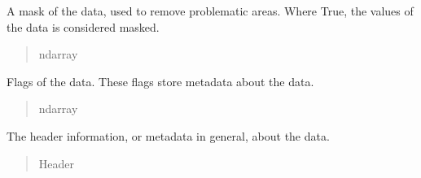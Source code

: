\documentclass[letterpaper,11pt,english]{sphinxmanual}
\begin{document}
\begin{savenotes}
\begin{fulllineitems}

\begin{savenotes}\begin{fulllineitems}
\label{\detokenize{code/lezargus.container.parent:lezargus.container.parent.LezargusContainerArithmetic.mask}}
\pysigstartsignatures
{}
\pysigstopsignatures
\sphinxAtStartPar
A mask of the data, used to remove problematic areas. Where True,
the values of the data is considered masked.
\begin{quote}\begin{description}
\sphinxAtStartPar
ndarray

\end{description}\end{quote}

\end{fulllineitems}\end{savenotes}


\begin{savenotes}\begin{fulllineitems}
\label{\detokenize{code/lezargus.container.parent:lezargus.container.parent.LezargusContainerArithmetic.flags}}
\pysigstartsignatures
{}
\pysigstopsignatures
\sphinxAtStartPar
Flags of the data. These flags store metadata about the data.
\begin{quote}\begin{description}
\sphinxAtStartPar
ndarray

\end{description}\end{quote}

\end{fulllineitems}\end{savenotes}


\begin{savenotes}\begin{fulllineitems}
\label{\detokenize{code/lezargus.container.parent:lezargus.container.parent.LezargusContainerArithmetic.header}}
\pysigstartsignatures
{}
\pysigstopsignatures
\sphinxAtStartPar
The header information, or metadata in general, about the data.
\begin{quote}\begin{description}
\sphinxAtStartPar
Header


\end{description}
\end{quote}
\end{fulllineitems}
\end{savenotes}
\end{fulllineitems}
\end{savenotes}
\end{document}

